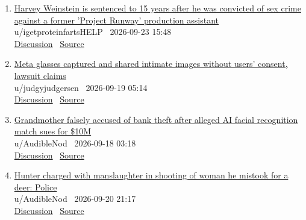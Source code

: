 \documentclass[11pt,a4paper]{article}
\begin{document}
\begin{enumerate}
  \item \href{https://www.reddit.com/r/news/comments/1wo9orv/harvey_weinstein_is_sentenced_to_15_years_after/}{Harvey Weinstein is sentenced to 15 years after he was convicted of sex crime against a former 'Project Runway' production assistant}\\ {\small u/igetproteinfartsHELP \textbullet\ 2026-09-23 15:48}\\ {\small \href{https://www.reddit.com/r/news/comments/1wo9orv/harvey_weinstein_is_sentenced_to_15_years_after/}{Discussion} \textbullet\ \href{https://www.nbcnews.com/news/us-news/harvey-weinstein-sentenced-15-years-new-york-sex-crime-conviction-rcna599213}{Source}}
  \item \href{https://www.reddit.com/r/news/comments/1wkd5rq/meta_glasses_captured_and_shared_intimate_images/}{Meta glasses captured and shared intimate images without users' consent, lawsuit claims}\\ {\small u/judgyjudgersen \textbullet\ 2026-09-19 05:14}\\ {\small \href{https://www.reddit.com/r/news/comments/1wkd5rq/meta_glasses_captured_and_shared_intimate_images/}{Discussion} \textbullet\ \href{https://www.latimes.com/business/story/2026-09-18/meta-glasses-captured-shared-intimate-images-without-users-consent-lawsuit-claims}{Source}}
  \item \href{https://www.reddit.com/r/news/comments/1wjet3h/grandmother_falsely_accused_of_bank_theft_after/}{Grandmother falsely accused of bank theft after alleged AI facial recognition match sues for \$10M}\\ {\small u/AudibleNod \textbullet\ 2026-09-18 03:18}\\ {\small \href{https://www.reddit.com/r/news/comments/1wjet3h/grandmother_falsely_accused_of_bank_theft_after/}{Discussion} \textbullet\ \href{https://abcnews.com/US/grandmother-falsely-accused-bank-theft-after-alleged-ai/story?id=136536444}{Source}}
  \item \href{https://www.reddit.com/r/news/comments/1wlt8qk/hunter_charged_with_manslaughter_in_shooting_of/}{Hunter charged with manslaughter in shooting of woman he mistook for a deer: Police}\\ {\small u/AudibleNod \textbullet\ 2026-09-20 21:17}\\ {\small \href{https://www.reddit.com/r/news/comments/1wlt8qk/hunter_charged_with_manslaughter_in_shooting_of/}{Discussion} \textbullet\ \href{https://abcnews.com/US/hunter-charged-manslaughter-shooting-woman-mistook-deer-police/story?id=136602964}{Source}}

\end{enumerate}
\end{document}
